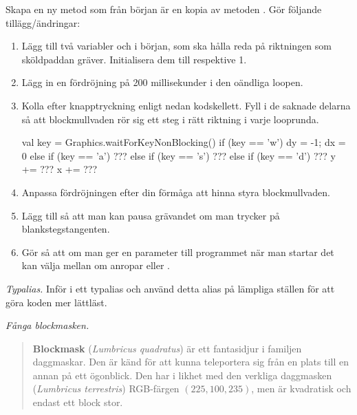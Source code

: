 \Subtask
Skapa en ny metod  som från början är en kopia av metoden . Gör följande tillägg/ändringar:
\begin{enumerate}

\item Lägg till två variabler  och  i början, som ska hålla reda på riktningen som sköldpaddan gräver. Initialisera dem till  respektive {1}.

\item Lägg in en fördröjning på 200 millisekunder i den oändliga loopen.

\item Kolla efter knapptryckning enligt nedan kodskellett. Fyll i de saknade delarna så att blockmullvaden rör sig ett steg i rätt riktning i varje looprunda.
\begin{Code}
      val key = Graphics.waitForKeyNonBlocking()
      if      (key == 'w') { dy = -1; dx = 0 }
      else if (key == 'a') { ??? }
      else if (key == 's') { ??? }
      else if (key == 'd') { ??? }
      y += ???
      x += ???
\end{Code}

\item Anpassa fördröjningen efter din förmåga att hinna styra blockmullvaden.

\item Lägg till så att man kan pausa grävandet om man trycker på blankstegstangenten.

\item Gör så att om man ger en parameter  till programmet när man startar det kan välja mellan om  anropar  eller .

\end{enumerate}


\Task \emph{Typalias.} Inför i  ett typalias  och använd detta alias på lämpliga ställen för att göra koden mer lättläst.


\Task \emph{Fånga blockmasken.}

\begin{quote}
  \noindent\textbf{Blockmask} (\textit{Lumbricus quadratus}) är ett fantasidjur i familjen daggmaskar. Den är känd för att kunna teleportera sig från en plats till en annan på ett ögonblick. Den har i likhet med den verkliga daggmasken (\emph{Lumbricus terrestris}) RGB-färgen $(225, 100, 235)$, men är kvadratisk och endast ett block stor.
\end{quote}

